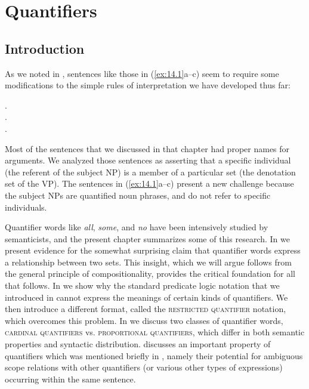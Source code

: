 \chapter{Quantifiers}\label{sec:14}

\section{Introduction}\label{sec:14.1}

As we noted in , sentences like those in (\ref{ex:14.1}a--c) seem to require some modifications to the simple rules of interpretation we have developed thus far:


\ea \label{ex:14.1}
.\\
.\\
.
                       \z
\z


Most of the sentences that we discussed in that chapter had proper names for arguments. We analyzed those sentences as asserting that a specific individual (the referent of the subject NP) is a member of a particular set (the denotation set of the VP). The sentences in (\ref{ex:14.1}a--c) present a new challenge because the subject NPs are quantified noun phrases, and do not refer to specific individuals.



Quantifier words like \textit{all}, \textit{some}, and \textit{no} have been intensively studied by semanticists, and the present chapter summarizes some of this research. In  we present evidence for the somewhat surprising claim that quantifier words express a relationship between two sets. This insight, which we will argue follows from the general principle of compositionality, provides the critical foundation for all that follows. In  we show why the standard predicate logic notation that we introduced in  cannot express the meanings of certain kinds of quantifiers. We then introduce a different format, called the \textsc{restricted quantifier} notation, which overcomes this problem. In  we discuss two classes of quantifier words, \textsc{cardinal quantifiers} vs. \textsc{proportional quantifiers}, which differ in both semantic properties and syntactic distribution.  discusses an important property of quantifiers which was mentioned briefly in , namely their potential for ambiguous scope relations with other quantifiers (or various other types of expressions) occurring within the same sentence.



